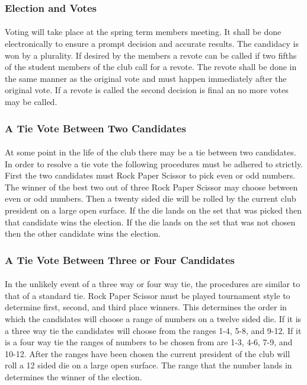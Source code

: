 \documentclass[12pt]{article}
\begin{document}
\subsubsection{Election and Votes}
\paragraph{}
Voting will take place at the spring term members meeting. 
It shall be done electronically to ensure a prompt decision and accurate results. 
The candidacy is won by a plurality.
If desired by the members a revote can be called if two fifths of the student members of the club call for a revote. 
The revote shall be done in the same manner as the original vote and must happen immediately after
the original vote.
If a revote is called the second decision is final an no more votes may be called. 

\subsubsection{A Tie Vote Between Two Candidates}
\paragraph{}
At some point in the life of the club there may be a tie between two candidates. In order to resolve a tie vote the following procedures must be adhered to strictly. First the two candidates must Rock Paper Scissor to pick even or odd numbers. The winner of the best two out of three Rock Paper Scissor may choose between even or odd numbers. Then a twenty sided die will be rolled by the current club president on a large open surface. If the die lands on the set that was picked then that candidate wins the election. If the die lands on the set that was not chosen then the other candidate wins the election.

\subsubsection {A Tie Vote Between Three or Four Candidates}
\paragraph{}
In the unlikely event of a three way or four way tie, the procedures are similar to that of a standard tie. Rock Paper Scissor must be played tournament style to determine first, second, and third place winners. This determines the order in which the candidates will choose a range of numbers on a twelve sided die. If it is a three way tie the candidates will choose from the ranges 1-4, 5-8, and 9-12. If it is a four way tie the ranges of numbers to be chosen from are 1-3, 4-6, 7-9, and 10-12. After the ranges have been chosen the current president of the club will roll a 12 sided die on a large open surface. The range that the number lands in determines the winner of the election.
\end{document}

